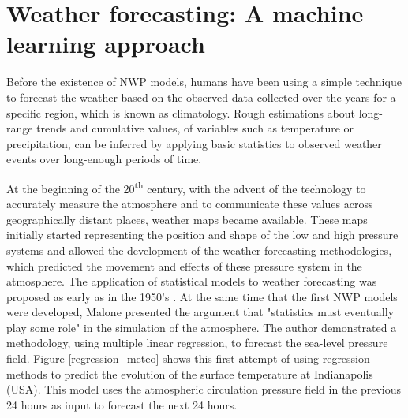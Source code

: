 \bigskip
\bigskip


\bigskip
\bigskip


\medskip











\section{Weather forecasting: A machine learning approach}

Before the existence of NWP models, humans have been using a simple technique to forecast the weather based on the observed data collected over the years for a specific region, which is known as climatology. Rough estimations about long-range trends and cumulative values, of variables such as temperature or precipitation, can be inferred by applying basic statistics to observed weather events over long-enough periods of time.

\medskip

At the beginning of the 20\textsuperscript{th} century, with the advent of the technology to accurately measure the atmosphere and to communicate these values across geographically distant places, weather maps became available. These maps initially started representing the position and shape of the low and high pressure systems and allowed the development of the weather forecasting methodologies, which predicted the movement and effects of these pressure system in the atmosphere. The application of statistical models to weather forecasting was proposed as early as in the 1950's \citep{malone1955application}. At the same time that the first NWP models were developed, Malone presented the argument that "statistics must eventually play some role" in the simulation of the atmosphere. The author demonstrated a methodology, using multiple linear regression, to forecast the sea-level pressure field. Figure \ref{regression_meteo} shows this first attempt of using regression methods to predict the evolution of the surface temperature at Indianapolis (USA). This model uses the atmospheric circulation pressure field in the previous 24 hours as input to forecast the next 24 hours.

